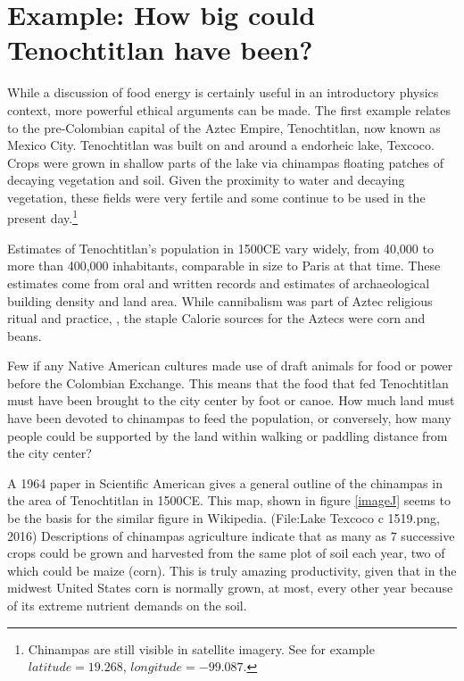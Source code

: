 \documentclass[onecolumn]{article}
\begin{document}
\section{Example: How big could Tenochtitlan have been?}
While a discussion of food energy is certainly useful in an introductory physics context, more powerful ethical arguments can be made.
The first example relates to the pre-Colombian capital of the Aztec Empire, Tenochtitlan, now known as Mexico City.  Tenochtitlan was built on and around a endorheic lake, Texcoco.  Crops were grown in shallow parts of the lake via chinampas\cite{national_geo} floating patches of decaying vegetation and soil.  Given the proximity to water and decaying vegetation, these fields were very fertile \cite{Chinampas_1964,HortTech_2019} and some continue to be used in the present day.\footnote{
Chinampas are still visible in satellite imagery.  See for example $latitude=19.268$, $longitude=-99.087$.
}


Estimates of Tenochtitlan's population in 1500CE vary widely, from 40,000
\cite{40k}
to more than 400,000 inhabitants\cite{400k}, comparable in size to Paris at that time. These estimates come from oral and written records and estimates of archaeological building density and land area.   While cannibalism was part of Aztec religious ritual and practice,
\cite{Aztec_Cannibalism}, the staple Calorie sources for the Aztecs were corn and beans.

Few if any Native American cultures made use of draft animals for food or power before the Colombian Exchange.  This means that the food that fed Tenochtitlan must have been brought to the city center by foot or canoe.  How much land must have been devoted to chinampas to feed the population, or conversely, how many people could be supported by the land within walking or paddling distance from the city center?

A 1964 paper in Scientific American \cite{Chinampas_1964} gives a general outline of the chinampas in the area of Tenochtitlan in 1500CE.  This map, shown in figure \ref{imageJ} seems to be the basis for the similar figure in Wikipedia. (File:Lake Texcoco c 1519.png, 2016)
Descriptions of chinampas agriculture indicate that as many as $7$ successive crops could be grown and harvested from the same plot of soil each year, two of which could be maize (corn).  This is truly amazing productivity, given that in the midwest United States corn is normally grown, at most, every other year because of its extreme nutrient demands on the soil.
\end{document}
